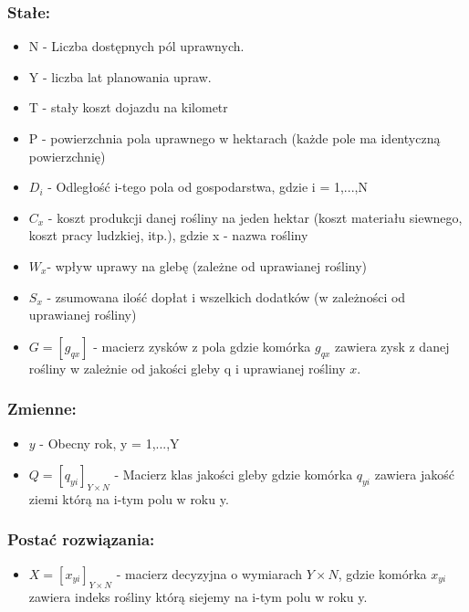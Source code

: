 \documentclass[12pt,a4paper]{article}
\begin{document}
	\subsubsection{Stałe:}
	\begin{itemize}
		\item N - Liczba dostępnych pól uprawnych.
		
		\item Y - liczba lat planowania upraw.
		
		\item T - stały koszt dojazdu na kilometr
		
		\item P - powierzchnia pola uprawnego w hektarach (każde pole ma identyczną powierzchnię)
		
		\item $ D_i $ -  Odległość i-tego pola od gospodarstwa, gdzie i = 1,...,N
		
		\item $ C_x $ - koszt produkcji danej rośliny na jeden hektar (koszt materiału siewnego, koszt pracy ludzkiej, itp.), gdzie x - nazwa rośliny
		
		\item $ W_x $- wpływ uprawy na glebę (zależne od uprawianej rośliny)
		
		\item $ S_x $ - zsumowana ilość dopłat i  wszelkich dodatków (w zależności od uprawianej rośliny)
		
		\item $ G = [g_{qx}] $ - macierz zysków z pola gdzie komórka  $ g_{qx} $ zawiera zysk z danej rośliny w zależnie od jakości gleby q i uprawianej rośliny $ x $.
	\end{itemize}

	\subsubsection{Zmienne:}
	\begin{itemize}
		\item $y$ - Obecny rok, y = 1,...,Y
		
		\item $ Q = [ q_{yi} ]_{Y \times N} $ -  Macierz klas jakości gleby gdzie komórka $ q_{yi} $ zawiera jakość ziemi którą na i-tym polu w roku y.
	\end{itemize}
	
	\subsubsection{Postać rozwiązania:} 
	\begin{itemize}
		\item $ X = [x_{yi}]_{Y \times N} $ - macierz decyzyjna o wymiarach $ Y \times N $, gdzie komórka $ x_{yi} $ zawiera indeks rośliny którą siejemy na i-tym polu w roku y.
	\end{itemize}
	
\end{document}
